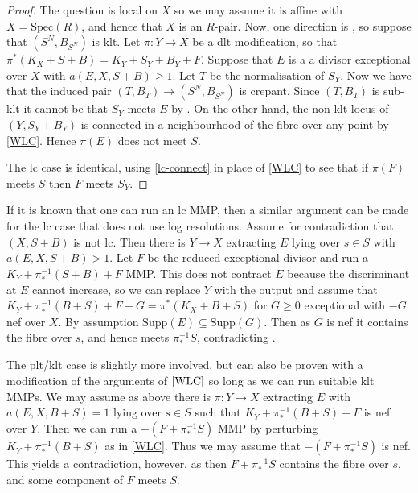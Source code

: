 \begin{proof}
	The question is local on $X$ so we may assume it is affine with $X=\text{Spec}(R)$, and hence that $X$ is an $R$-pair. Now, one direction is \cite[Lemma 4.8]{kk-singbook}, so suppose that $(S^{N},B_{S^{N}})$ is klt. Let $\pi\colon Y \to X$ be a dlt modification, so that $\pi^{*}(K_{X}+S+B)=K_{Y}+S_{Y}+B_{Y}+F$. Suppose that $E$ is a a divisor exceptional over $X$ with $a(E,X,S+B) \geq 1$. Let $T$ be the normalisation of $S_{Y}$. Now we have that the induced pair $(T,B_{T})\to (S^{N},B_{S^{N}})$ is crepant. Since $(T,B_{T})$ is sub-klt it cannot be that $S_{Y}$ meets $E$ by \cite[Claim 4.7.3]{kk-singbook}. On the other hand, the non-klt locus of $(Y,S_{Y}+B_{Y})$ is connected in a neighbourhood of the fibre over any point by \autoref{WLC}. Hence $\pi(E)$ does not meet $S$.
	
	The lc case is identical, using \autoref{lc-connect} in place of \autoref{WLC} to see that if $\pi(F)$ meets $S$ then $F$ meets $S_{Y}$. 
\end{proof}

\begin{remark}\label{no-res}
	
	If it is known that one can run an lc MMP, then a similar argument can be made for the lc case that does not use log resolutions. Assume for contradiction that $(X,S+B)$ is not lc. Then there is $Y \to X$ extracting $E$ lying over $s \in S$ with $a(E,X,S+B)> 1$. Let $F$ be the reduced exceptional divisor and run a $K_{Y}+\pi_{*}^{-1}(S+B)+F$ MMP. This does not contract $E$ because the discriminant at $E$ cannot increase, so we can replace $Y$ with the output and assume that $K_{Y}+\pi_{*}^{-1}(B+S)+F+G=\pi^{*}(K_{X}+B+S)$ for $G\geq0$ exceptional with $-G$ nef over $X$. By assumption $\text{Supp}(E) \subseteq \text{Supp}(G)$. Then as $G$ is nef it contains the fibre over $s$, and hence meets $\pi_{*}^{-1}S$, contradicting \cite[Claim 4.7.3]{kk-singbook}.
	
	The plt/klt case is slightly more involved, but can also be proven with a modification of the arguments of $\autoref{WLC}$ so long as we can run suitable klt MMPs. We may assume as above there is $\pi \colon Y \to X$ extracting $E$ with $a(E,X,B+S)=1$ lying over $s \in S$ such that $K_{Y}+\pi_{*}^{-1}(B+S)+F$ is nef over $Y$. Then we can run a $-(F+\pi_{*}^{-1}S)$ MMP by perturbing $K_{Y}+\pi_{*}^{-1}(B+S)$ as in \autoref{WLC}. Thus we may assume that $-(F+\pi_{*}^{-1}S)$ is nef. This yields a contradiction, however, as then $F+\pi_{*}^{-1}S$ contains the fibre over $s$, and some component of $F$ meets $S$.
	\end{remark}

